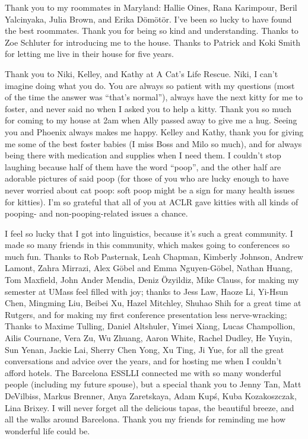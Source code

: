 Thank you to my roommates in Maryland: Hallie Oines, Rana Karimpour, Beril Yalcinyaka, Julia Brown, and Erika Dömötör. I’ve been so lucky to have found the best roommates. Thank you for being so kind and understanding. Thanks to Zoe Schluter for introducing me to the house. Thanks to Patrick and Koki Smith for letting me live in their house for five years.
 
Thank you to Niki, Kelley, and Kathy at A Cat’s Life Rescue. Niki, I can’t imagine doing what you do. You are always so patient with my questions (most of the time the answer was “that’s normal”), always have the next kitty for me to foster, and never said no when I asked you to help a kitty. Thank you so much for coming to my house at 2am when Ally passed away to give me a hug. Seeing you and Phoenix always makes me happy. Kelley and Kathy, thank you for giving me some of the best foster babies (I miss Boss and Milo so much), and for always being there with medication and supplies when I need them. I couldn’t stop laughing because half of them have the word ``poop”, and the other half are adorable pictures of said poop (for those of you who are lucky enough to have never worried about cat poop: soft poop might be a sign for many health issues for kitties). I’m so grateful that all of you at ACLR gave kitties with all kinds of pooping- and non-pooping-related issues a chance.
 
I feel so lucky that I got into linguistics, because it’s such a great community. I made so many friends in this community, which makes going to conferences so much fun. Thanks to Rob Pasternak, Leah Chapman, Kimberly Johnson, Andrew Lamont, Zahra Mirrazi, Alex Göbel and Emma Nguyen-Göbel, Nathan Huang, Tom Maxfield, John Ander Mendia, Deniz Özyildiz, Mike Clauss, for making my semester at UMass feel filled with joy; thanks to Jess Law, Haoze Li, Yi-Hsun Chen, Mingming Liu, Beibei Xu, Hazel Mitchley, Shuhao Shih for a great time at Rutgers, and for making my first conference presentation less nerve-wracking; Thanks to Maxime Tulling, Daniel Altshuler, Yimei Xiang, Lucas Champollion, Ailis Cournane, Vera Zu, Wu Zhuang, Aaron White, Rachel Dudley, He Yuyin, Sun Yenan, Jackie Lai, Sherry Chen Yong, Xu Ting, Ji Yue, for all the great conversations and advice over the years, and for hosting me when I couldn’t afford hotels. The Barcelona ESSLLI connected me with so many wonderful people (including my future spouse), but a special thank you to Jenny Tan, Matt DeVilbiss, Markus Brenner, Anya Zaretskaya, Adam Kupś, Kuba Kozakoszczak, Lina Brixey. I will never forget all the delicious tapas, the beautiful breeze, and all the walks around Barcelona. Thank you my friends for reminding me how wonderful life could be.

